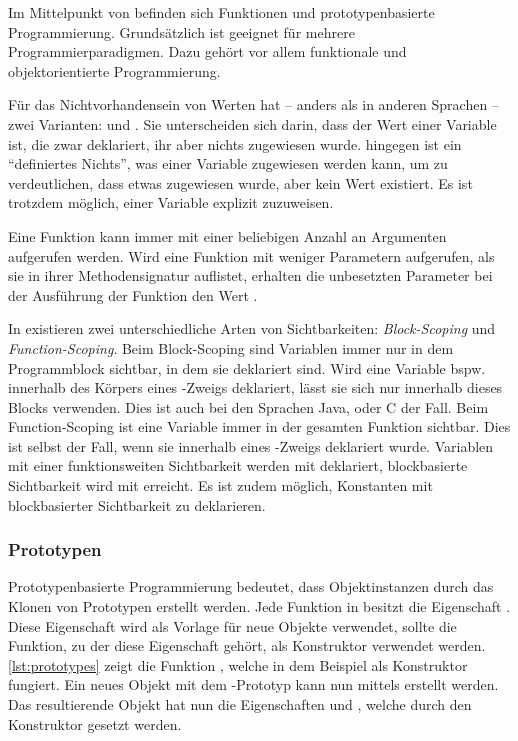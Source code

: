 \documentclass[a4paper]{scrartcl}
\begin{document}
Im Mittelpunkt von \js{} befinden sich Funktionen und prototypenbasierte Programmierung.
Grund\-sätz\-lich ist \js{} geeignet für mehrere Programmierparadigmen.
Dazu gehört vor allem funktionale und objektorientierte Programmierung.

Für das Nichtvorhandensein von Werten hat \js{} -- anders als in anderen Sprachen -- zwei Varianten: \tsnull{} und \tsundefined{}.
Sie unterscheiden sich darin, dass \tsundefined{} der Wert einer Variable ist, die zwar deklariert, ihr aber nichts zugewiesen wurde.
\tsnull{} hingegen ist ein \enquote{definiertes Nichts}, was einer Variable zugewiesen werden kann, um zu verdeutlichen, dass etwas zugewiesen wurde, aber kein Wert existiert.
Es ist trotzdem möglich, einer Variable explizit \tsundefined{} zuzuweisen.

Eine Funktion kann immer mit einer beliebigen Anzahl an Argumenten aufgerufen werden.
Wird eine Funktion mit weniger Parametern aufgerufen, als sie in ihrer Methodensignatur auflistet, erhalten die unbesetzten Parameter bei der Ausführung der Funktion den Wert \tsundefined{}.

In \js{} existieren zwei unterschiedliche Arten von Sichtbarkeiten: \textit{Block-Scoping} und \textit{Function-Scoping}.
Beim Block-Scoping sind Variablen immer nur in dem Programmblock sichtbar, in dem sie deklariert sind.
Wird eine Variable bspw. innerhalb des Körpers eines \tsif-Zweigs deklariert, lässt sie sich nur innerhalb dieses Blocks verwenden.
Dies ist auch bei den Sprachen Java, \cs{} oder C der Fall.
Beim Function-Scoping ist eine Variable immer in der gesamten Funktion sichtbar.
Dies ist selbst der Fall, wenn sie innerhalb eines \tsif-Zweigs deklariert wurde.
Variablen mit einer funktionsweiten Sichtbarkeit werden mit \tsvar{} deklariert, blockbasierte Sichtbarkeit wird mit \tslet{} erreicht.
Es ist zudem möglich, Konstanten mit blockbasierter Sichtbarkeit zu deklarieren.

\subsubsection*{Prototypen}
Prototypenbasierte Programmierung bedeutet, dass Objektinstanzen durch das Klonen von Prototypen erstellt werden.
Jede Funktion in \js{} besitzt die Eigenschaft .
Diese Eigenschaft wird als Vorlage für neue Objekte verwendet, sollte die Funktion, zu der diese Eigenschaft gehört, als Konstruktor verwendet werden.
\autoref{lst:prototypes} zeigt die Funktion , welche in dem Beispiel als Konstruktor fungiert.
Ein neues Objekt mit dem -Prototyp kann nun mittels  erstellt werden.
Das resultierende Objekt  hat nun die Eigenschaften  und , welche durch den Konstruktor gesetzt werden.
\end{document}
